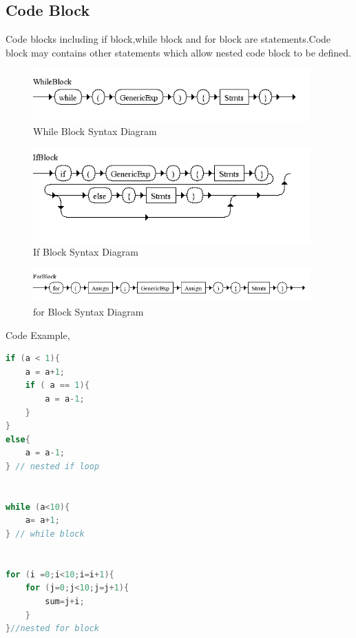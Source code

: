 \subsection{Code Block}
Code blocks including if block,while block and for block are statements.Code block may contains other statements which allow nested code block to be defined.



\begin{figure}[H]
  \centering
	\includegraphics[width=0.95\textwidth]{pic/c4/while_block.png}
	\caption{While Block Syntax Diagram}
\end{figure}


\begin{figure}[H]
  \centering
	\includegraphics[width=0.95\textwidth]{pic/c4/if_block.png}
	\caption{If Block Syntax Diagram}
\end{figure}

\begin{figure}[H]
  \centering
	\includegraphics[width=0.95\textwidth]{pic/c4/for_block.png}
	\caption{for Block Syntax Diagram}
\end{figure}

Code Example,
\begin{lstlisting}[language=java]
if (a < 1){
	a = a+1;
	if ( a == 1){
		a = a-1;
	}	
}
else{
	a = a-1;
} // nested if loop


while (a<10){
	a= a+1;
} // while block


for (i =0;i<10;i=i+1){
	for (j=0;j<10;j=j+1){
		sum=j+i;
	}
}//nested for block

\end{lstlisting}
